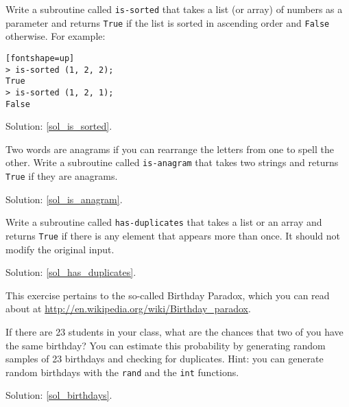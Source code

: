 \begin{exercise}
Write a subroutine called \verb"is-sorted" that takes 
a list (or array) of numbers as a parameter and returns 
{\tt True} if the list is sorted in ascending order and 
{\tt False} otherwise.  For example:
\label{is_sorted}

\begin{verbatim}[fontshape=up]
> is-sorted (1, 2, 2);
True
> is-sorted (1, 2, 1);
False
\end{verbatim}

Solution: \ref{sol_is_sorted}.

\end{exercise}


\begin{exercise}

\label{is_anagram}
Two words are anagrams if you can rearrange the letters 
from one to spell the other.  Write a subroutine called 
\verb"is-anagram" that takes two strings and returns 
{\tt True} if they are anagrams.

Solution: \ref{sol_is_anagram}.

\end{exercise}



\begin{exercise}
\label{has_duplicates}

Write a subroutine called \verb"has-duplicates" that takes
a list or an array and returns {\tt True} if there is 
any element that appears more than once.  It should 
not modify the original input.

Solution: \ref{sol_has_duplicates}.

\end{exercise}


\begin{exercise}

This exercise pertains to the so-called Birthday Paradox, 
which you can read about at 
\url{http://en.wikipedia.org/wiki/Birthday_paradox}.
\label{birthdays}

If there are 23 students in your class, what are the 
chances that two of you have the same birthday?  You 
can estimate this probability by generating random 
samples of 23 birthdays and checking for duplicates. 
Hint: you can generate random birthdays
with the {\tt rand} and the {\tt int} functions.

Solution: \ref{sol_birthdays}.

\end{exercise}



